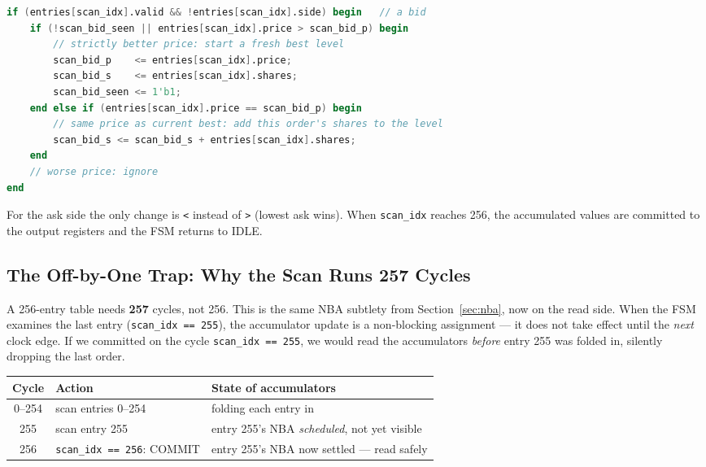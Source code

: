 \documentclass[11pt,a4paper]{article}
\begin{document}
\begin{lstlisting}[language=Verilog,
  caption={Per-entry rescan logic --- bid side (ask is the mirror with \texttt{<})}]
if (entries[scan_idx].valid && !entries[scan_idx].side) begin   // a bid
    if (!scan_bid_seen || entries[scan_idx].price > scan_bid_p) begin
        // strictly better price: start a fresh best level
        scan_bid_p    <= entries[scan_idx].price;
        scan_bid_s    <= entries[scan_idx].shares;
        scan_bid_seen <= 1'b1;
    end else if (entries[scan_idx].price == scan_bid_p) begin
        // same price as current best: add this order's shares to the level
        scan_bid_s <= scan_bid_s + entries[scan_idx].shares;
    end
    // worse price: ignore
end
\end{lstlisting}

\noindent For the ask side the only change is \texttt{<} instead of \texttt{>}
(lowest ask wins). When \texttt{scan\_idx} reaches 256, the accumulated values
are committed to the output registers and the FSM returns to IDLE.

\subsection{The Off-by-One Trap: Why the Scan Runs 257 Cycles}

A 256-entry table needs \textbf{257} cycles, not 256. This is the same NBA
subtlety from Section~\ref{sec:nba}, now on the read side. When the FSM examines
the last entry (\texttt{scan\_idx == 255}), the accumulator update is a
non-blocking assignment --- it does not take effect until the \emph{next} clock
edge. If we committed on the cycle \texttt{scan\_idx == 255}, we would read the
accumulators \emph{before} entry 255 was folded in, silently dropping the last
order.

\begin{center}
\small
\begin{tabular}{c l l}
\toprule
\textbf{Cycle} & \textbf{Action} & \textbf{State of accumulators} \\
\midrule
0--254 & scan entries 0--254 & folding each entry in \\
255    & scan entry 255      & entry 255's NBA \emph{scheduled}, not yet visible \\
\rowcolor{fpgalight}
256    & \texttt{scan\_idx == 256}: COMMIT & entry 255's NBA now settled --- read safely \\
\bottomrule
\end{tabular}
\end{center}
\end{document}
